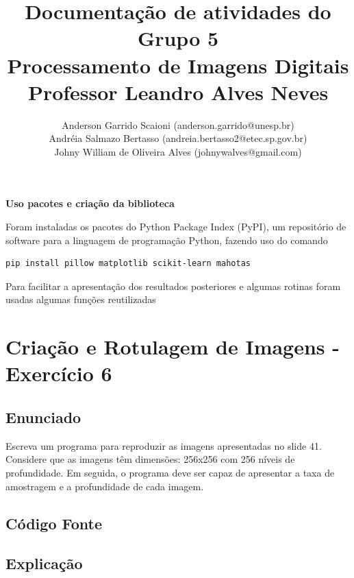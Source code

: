 \documentclass[10pt,a4paper]{article}
\title{Documentação de atividades do Grupo 5 \\ Processamento de Imagens Digitais \\ Professor Leandro Alves Neves}
\author{Anderson Garrido Scaioni (anderson.garrido@unesp.br) \\ Andréia Salmazo Bertasso (andreia.bertasso2@etec.sp.gov.br) \\ Johny William de Oliveira Alves (johnywalves@gmail.com)}
\begin{document}
\maketitle

\begin{flushleft}
\textbf{Uso pacotes e criação da biblioteca}
\end{flushleft}

\begin{flushleft}
Foram instaladas os pacotes do Python Package Index (PyPI), um repositório de software para a linguagem de programação Python, fazendo uso do comando
\end{flushleft}

\begin{lstlisting}[language=Bash]
pip install pillow matplotlib scikit-learn mahotas
\end{lstlisting}

\begin{flushleft}
Para facilitar a apresentação dos resultados posteriores e algumas rotinas foram usadas algumas funções reutilizadas
\end{flushleft}



\pagebreak

\section{Criação e Rotulagem de Imagens - Exercício 6}

\subsection{Enunciado}

Escreva um programa para reproduzir as imagens apresentadas no slide 41. Considere que as imagens têm dimensões: 256x256 com 256 níveis de profundidade. Em seguida, o programa deve ser capaz de apresentar a taxa de amostragem e a profundidade de cada imagem.

\subsection{Código Fonte}



\subsection{Explicação}
\end{document}
